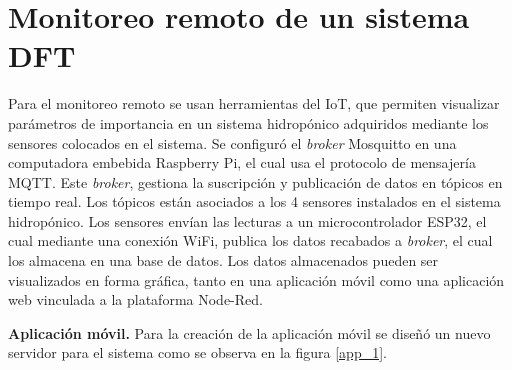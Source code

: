 \section{Monitoreo remoto de un sistema DFT}
Para el monitoreo remoto se usan herramientas del IoT, que permiten visualizar parámetros de importancia en un sistema hidropónico adquiridos mediante los sensores colocados en el sistema. Se configuró el \textit{broker} Mosquitto en una computadora embebida Raspberry Pi, el cual usa el protocolo de mensajería MQTT. Este \textit{broker}, gestiona la suscripción y publicación de datos en tópicos en tiempo real. Los tópicos están asociados a los 4 sensores instalados en el sistema hidropónico. Los sensores envían las lecturas a un microcontrolador ESP32, el cual mediante una conexión WiFi, publica los datos recabados a \textit{broker}, el cual los almacena en una base de datos. Los datos almacenados pueden ser visualizados en forma gráfica, tanto en una aplicación móvil como una aplicación web vinculada a la plataforma Node-Red.

\textbf{Aplicación móvil.} Para la creación de la aplicación móvil se diseñó un nuevo servidor para el sistema como se observa en la figura \ref{app_1}.


